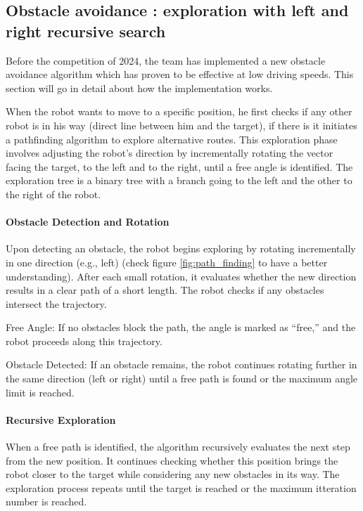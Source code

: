 \subsection{Obstacle avoidance : exploration with left and right recursive search}
Before the competition of 2024, the team has implemented a new obstacle avoidance algorithm which has
proven to be effective at low driving speeds. This section will go in detail about how the implementation works.

When the robot wants to move to a specific position, he first checks if any other robot is in his way (direct line between him and the target), if there is it initiates a pathfinding algorithm to explore alternative routes. This exploration phase involves adjusting the robot’s direction by incrementally rotating the vector facing the target, to the left and to the right, until a free angle is identified. The exploration tree is a binary tree with a branch going to the left and the other to the right of the robot.

\paragraph{Obstacle Detection and Rotation}

Upon detecting an obstacle, the robot begins exploring by rotating incrementally in one direction (e.g., left) (check figure \ref{fig:path_finding} to have a better understanding). After each small rotation, it evaluates whether the new direction results in a clear path of a short length. The robot checks if any obstacles intersect the trajectory.

Free Angle: If no obstacles block the path, the angle is marked as “free,” and the robot proceeds along this trajectory.

Obstacle Detected: If an obstacle remains, the robot continues rotating further in the same direction (left or right) until a free path is found or the maximum angle limit is reached.

\paragraph{Recursive Exploration}

When a free path is identified, the algorithm recursively evaluates the next step from the new position. It continues checking whether this position brings the robot closer to the target while considering any new obstacles in its way. The exploration process repeats until the target is reached or the maximum itteration number is reached.

